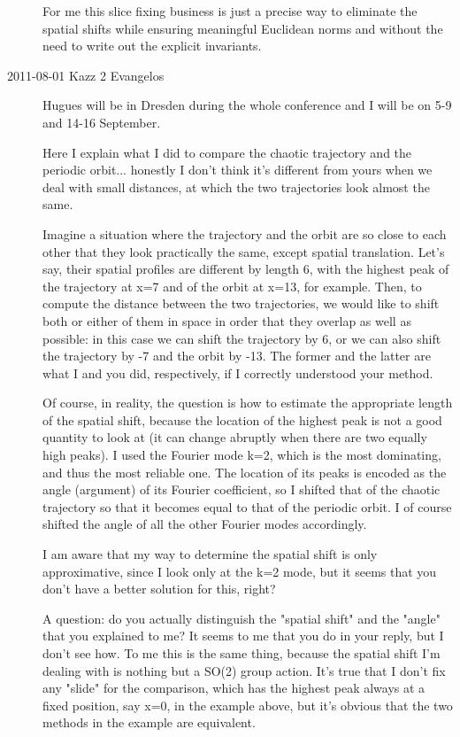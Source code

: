 \begin{description}
For me this slice fixing business is just a precise way to eliminate
the spatial shifts while ensuring meaningful Euclidean norms and
without the need to write out the explicit invariants.

\item[2011-08-01 Kazz 2 Evangelos] Hugues will be in Dresden during
the whole conference
and I will be on 5-9 and 14-16 September.

Here I explain what I did to compare the chaotic trajectory and the periodic
orbit... honestly I don't think it's different from yours when we deal
with small distances, at which the two trajectories look almost the same.

Imagine a situation where the trajectory and the orbit are so close to each
other that they look practically the same, except spatial translation.
Let's say, their spatial profiles are different by length 6, with the highest
peak of the trajectory at x=7 and of the orbit at x=13, for example.
Then, to compute the distance between the two trajectories, we would like
to shift both or either of them in space in order that they overlap as well
as possible: in this case we can shift the trajectory by 6, or we can also
shift the trajectory by -7 and the orbit by -13. The former and the latter
are what I and you did, respectively, if I correctly understood your method.

Of course, in reality, the question is how to estimate the appropriate
length of the spatial shift, because the location of the highest peak is
not a good quantity to look at (it can change abruptly when there are two
equally high peaks). I used the Fourier mode k=2, which is the most dominating,
and thus the most reliable one. The location of its peaks is encoded as
the angle (argument) of its Fourier coefficient, so I shifted that of
the chaotic trajectory so that it becomes equal to that of the periodic orbit.
I of course shifted the angle of all the other Fourier modes accordingly.

I am aware that my way to determine the spatial shift is only approximative,
since I look only at the k=2 mode, but it seems that you don't have a better
solution for this, right?

A question: do you actually distinguish the "spatial shift" and the "angle"
that you explained to me? It seems to me that you do in your reply, but
I don't see how. To me this is the same thing, because the spatial shift
I'm dealing with is nothing but a SO(2) group action. It's true that
I don't fix any "slide" for the comparison, which has the highest peak
always at a fixed position, say x=0, in the example above, but it's obvious
that the two methods in the example are equivalent.


\end{description}
